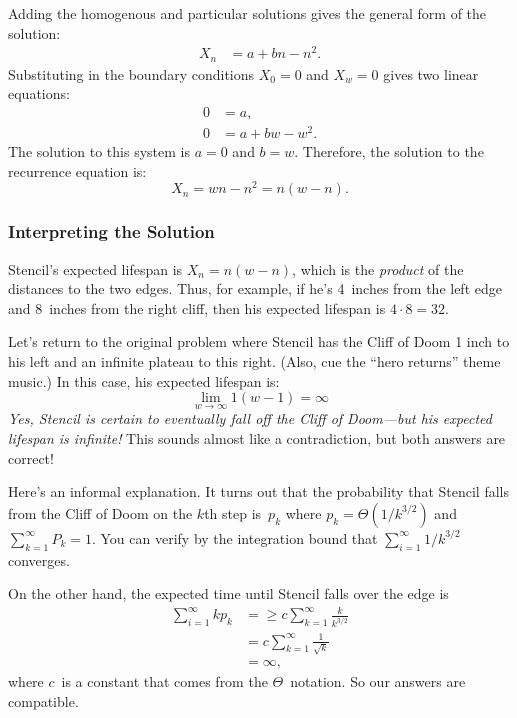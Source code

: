 Adding the homogenous and particular solutions gives the general form
of the solution:
%
\begin{align*}
    X_n & = a + b n - n^2.
\end{align*}
%
Substituting in the boundary conditions $X_0 = 0$ and $X_w = 0$ gives
two linear equations:
%
\begin{align*}
0 & = a, \\
0 & = a + b w - w^2.
\end{align*}
%
The solution to this system is $a = 0$ and $b = w$.  Therefore, the
solution to the recurrence equation is:
%
\[
X_n = w n - n^2 = n (w - n).
\]

\subsubsection{Interpreting the Solution}

Stencil's expected lifespan is $X_n = n (w - n)$, which is the
\emph{product} of the distances to the two edges.  Thus, for example,
if he's 4~inches from the left edge and 8~inches from the right cliff,
then his expected lifespan is $4 \cdot 8 = 32$.

Let's return to the original problem where Stencil has the Cliff of
Doom 1 inch to his left and an infinite plateau to this right.  (Also,
cue the ``hero returns'' theme music.)  In this case, his expected
lifespan is:
%
\[
\lim_{w \to \infty} 1 (w - 1) = \infty
\]
%
\emph{Yes, Stencil is certain to eventually fall off the Cliff of
  Doom---but his expected lifespan is infinite!}  This sounds almost
like a contradiction, but both answers are correct!

Here's an informal explanation.  It turns out that the probability
that Stencil falls from the Cliff of Doom on the $k$th step is~$p_k$
where $p_k = \Theta(1/k^{3/2})$ and $\sum_{k = 1}^\infty P_k = 1$.
You can verify by the integration bound that $\sum_{i = 1}^\infty
1/k^{3/2}$ converges.

On the other hand, the expected time until Stencil falls over the edge
is
\begin{align*}
\sum_{i = 1}^\infty k p_k
    &= \ge c \sum_{k = 1}^\infty \frac{k}{k^{3/2}} \\
    &=     c \sum_{k = 1}^\infty \frac{1}{\sqrt{k}} \\
    &=     \infty,
\end{align*}
where $c$~is a constant that comes from the $\Theta$~notation.  So our
answers are compatible.

